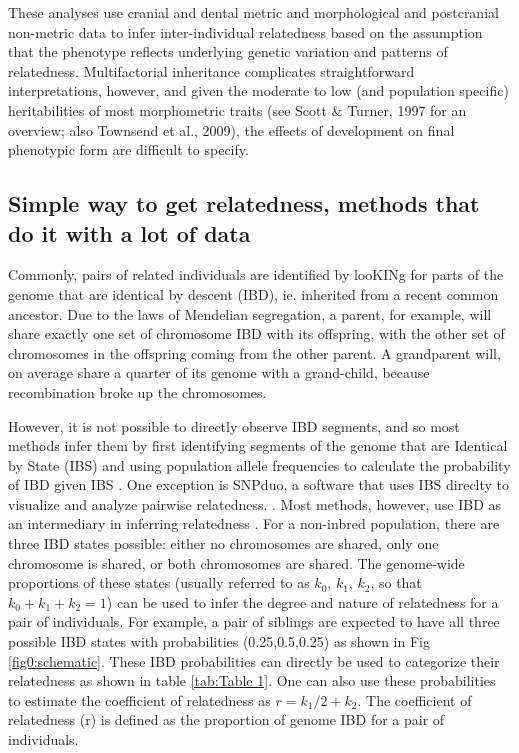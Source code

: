 \documentclass[12pt, letterpaper]{article}
\begin{document}
These analyses use cranial and dental metric and morphological and postcranial non-metric data to infer inter-individual relatedness based on the assumption that the phenotype reflects underlying genetic variation and patterns of relatedness. Multifactorial inheritance complicates straightforward interpretations, however, and given the moderate to low (and population specific) heritabilities of most morphometric traits (see Scott & Turner, 1997 for an overview; also Townsend et al., 2009), the effects of development on final phenotypic form are difficult to specify.


\subsection{Simple way to get relatedness, methods that do it with a lot of data}

Commonly, pairs of related individuals are  identified by looKINg for parts of the genome that are identical by descent (IBD), ie. inherited from a recent common ancestor. Due to the laws of Mendelian segregation, a parent, for example, will share exactly one set of chromosome IBD with its offspring, with the other set of chromosomes in the offspring coming from the other parent. A grandparent will, on average share a quarter of its genome with a grand-child, because recombination broke up the chromosomes.

However, it is not possible to directly observe IBD segments, and so most methods infer them by first identifying segments of the genome that are Identical by State (IBS) and using population allele frequencies to calculate the probability of IBD given IBS \cite{vai_KINship_2020}.  One exception is SNPduo, a software that uses IBS direclty to visualize and analyze pairwise relatedness. \cite{roberson_visualization_2009}. Most methods, however, use IBD as an intermediary in inferring relatedness \cite{boehnke_accurate_1997,lynch_estimation_1999,mcpeek_statistical_2000}. For a non-inbred population, there are three IBD states possible: either no chromosomes are shared, only one chromosome is shared, or both chromosomes are shared. The genome-wide proportions of these states (usually referred to as $k_0$, $k_1$, $k_2$, so that $k_0+k_1+k_2=1$) can be used to infer the degree and nature of relatedness for a pair of individuals. For example, a pair of siblings are expected to have all three possible IBD states with probabilities (0.25,0.5,0.25) as shown in Fig \ref{fig0:schematic}. These IBD probabilities can directly be used to categorize their relatedness as shown in table \ref{tab:Table 1}. One can also use these probabilities to estimate the coefficient of relatedness as $r= k_1/2 + k_2$. The coefficient of relatedness (r) is defined as the proportion of genome IBD for a pair of individuals.
\end{document}

